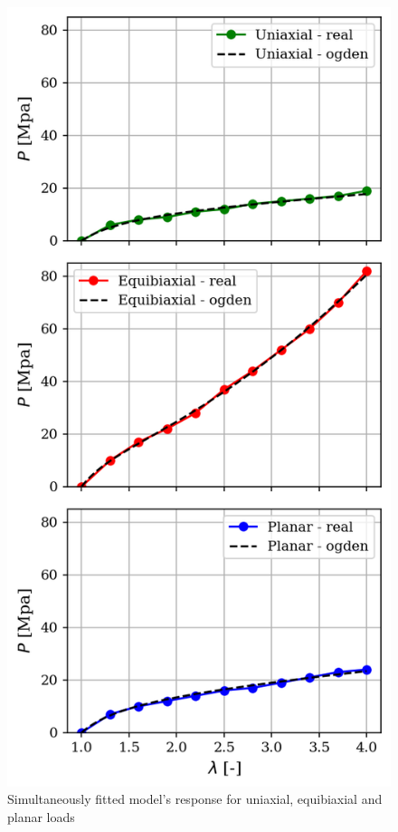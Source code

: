 \documentclass[12pt,a4paper]{article}
\begin{document}
\begin{figure}[h]
    \centering
    \includegraphics[scale=0.8]{figures/simultan_fit.png}
    \caption{Simultaneously fitted model's response for uniaxial, equibiaxial and planar loads}
\end{figure}
\end{document}
